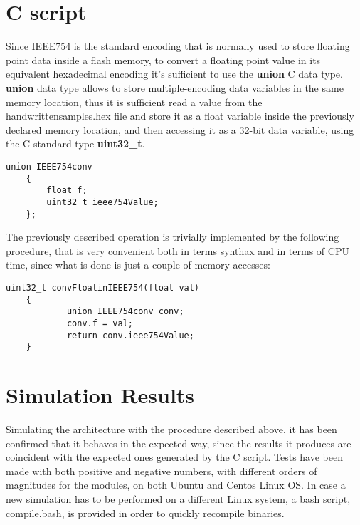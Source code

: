 \section{C script}
Since IEEE754 is the standard encoding that is normally used to store floating point data inside a flash memory, to convert a floating point value in its equivalent hexadecimal 
encoding it's sufficient to use the   \textbf{union}  C data type.
\textbf{union} data type allows to store multiple-encoding data variables in the same memory location, thus it is sufficient read a value from the handwrittensamples.hex file 
and store it as a float variable inside the previously declared memory location, and then accessing it as a 32-bit data variable, using the C standard type \textbf{uint32\_t}.
\begin{lstlisting}[style=CStyle]
    union IEEE754conv 
    {
        float f;
        uint32_t ieee754Value;
    };

\end{lstlisting}

The previously described operation is trivially implemented by the following procedure, that is very convenient both in terms synthax and in terms of CPU time, since what is done is just a couple of memory accesses:
\begin{lstlisting}[style=CStyle]
    uint32_t convFloatinIEEE754(float val)
    {
            union IEEE754conv conv;
            conv.f = val;
            return conv.ieee754Value;
    }
\end{lstlisting}
\section{Simulation Results}
Simulating the architecture with the procedure described above, it has been confirmed that it behaves in the expected way, since the results it produces are coincident with
the expected ones generated by the C script.
Tests have been made with both positive and negative numbers, with different orders of magnitudes for the modules, on both Ubuntu and Centos Linux OS. In case a new simulation has to be performed on a different Linux system, a bash script, compile.bash, is provided in order to 
quickly recompile binaries.
